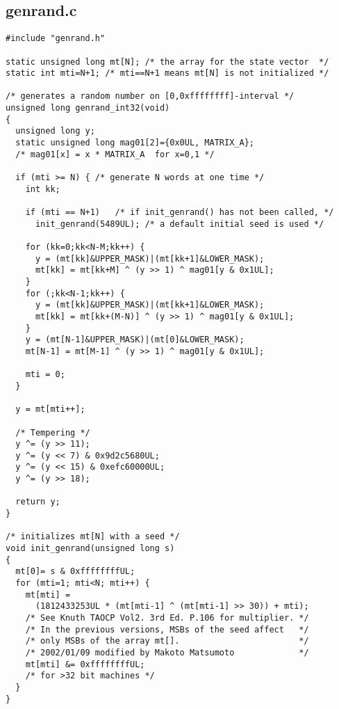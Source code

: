 \documentclass[letterpaper,10pt]{article}
\begin{document}
\subsection{genrand.c}
\begin{lstlisting}
#include "genrand.h"

static unsigned long mt[N]; /* the array for the state vector  */
static int mti=N+1; /* mti==N+1 means mt[N] is not initialized */

/* generates a random number on [0,0xffffffff]-interval */
unsigned long genrand_int32(void)
{
  unsigned long y;
  static unsigned long mag01[2]={0x0UL, MATRIX_A};
  /* mag01[x] = x * MATRIX_A  for x=0,1 */

  if (mti >= N) { /* generate N words at one time */
    int kk;

    if (mti == N+1)   /* if init_genrand() has not been called, */
      init_genrand(5489UL); /* a default initial seed is used */

    for (kk=0;kk<N-M;kk++) {
      y = (mt[kk]&UPPER_MASK)|(mt[kk+1]&LOWER_MASK);
      mt[kk] = mt[kk+M] ^ (y >> 1) ^ mag01[y & 0x1UL];
    }
    for (;kk<N-1;kk++) {
      y = (mt[kk]&UPPER_MASK)|(mt[kk+1]&LOWER_MASK);
      mt[kk] = mt[kk+(M-N)] ^ (y >> 1) ^ mag01[y & 0x1UL];
    }
    y = (mt[N-1]&UPPER_MASK)|(mt[0]&LOWER_MASK);
    mt[N-1] = mt[M-1] ^ (y >> 1) ^ mag01[y & 0x1UL];

    mti = 0;
  }

  y = mt[mti++];

  /* Tempering */
  y ^= (y >> 11);
  y ^= (y << 7) & 0x9d2c5680UL;
  y ^= (y << 15) & 0xefc60000UL;
  y ^= (y >> 18);

  return y;
}

/* initializes mt[N] with a seed */
void init_genrand(unsigned long s)
{
  mt[0]= s & 0xffffffffUL;
  for (mti=1; mti<N; mti++) {
    mt[mti] =
      (1812433253UL * (mt[mti-1] ^ (mt[mti-1] >> 30)) + mti);
    /* See Knuth TAOCP Vol2. 3rd Ed. P.106 for multiplier. */
    /* In the previous versions, MSBs of the seed affect   */
    /* only MSBs of the array mt[].                        */
    /* 2002/01/09 modified by Makoto Matsumoto             */
    mt[mti] &= 0xffffffffUL;
    /* for >32 bit machines */
  }
}

\end{lstlisting}
\newpage
\end{document}
